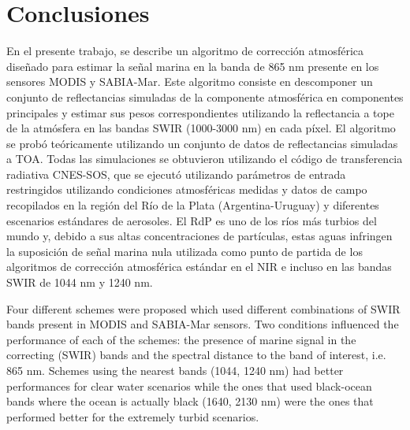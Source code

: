 \section{Conclusiones}

En el presente trabajo, se describe un algoritmo de corrección atmosférica diseñado para estimar la señal marina en la banda de 865 nm presente en los sensores MODIS y SABIA-Mar. Este algoritmo consiste en descomponer un conjunto de reflectancias simuladas de la componente atmosférica en componentes principales y estimar sus pesos correspondientes utilizando la reflectancia a tope de la atmósfera en las bandas SWIR (1000-3000 nm) en cada píxel. El algoritmo se probó teóricamente utilizando un conjunto de datos de reflectancias simuladas a TOA. Todas las simulaciones se obtuvieron utilizando el código de transferencia radiativa CNES-SOS, que se ejecutó utilizando parámetros de entrada restringidos utilizando condiciones atmosféricas medidas y datos de campo recopilados en la región del Río de la Plata (Argentina-Uruguay) y diferentes escenarios estándares de aerosoles. El RdP es uno de los ríos más turbios del mundo y, debido a sus altas concentraciones de partículas, estas aguas infringen la suposición de señal marina nula utilizada como punto de partida de los algoritmos de corrección atmosférica estándar en el NIR e incluso en las bandas SWIR de 1044 nm y 1240 nm.

Four different schemes were proposed which used different combinations of SWIR bands present in MODIS and SABIA-Mar sensors. Two conditions influenced the performance of each of the schemes: the presence of marine signal in the correcting (SWIR) bands and the spectral distance to the band of interest, i.e. 865 nm. Schemes using the nearest bands (1044, 1240 nm) had better performances for clear water scenarios while the ones that used black-ocean bands where the ocean is actually black (1640, 2130 nm) were the ones that performed better for the extremely turbid scenarios.
